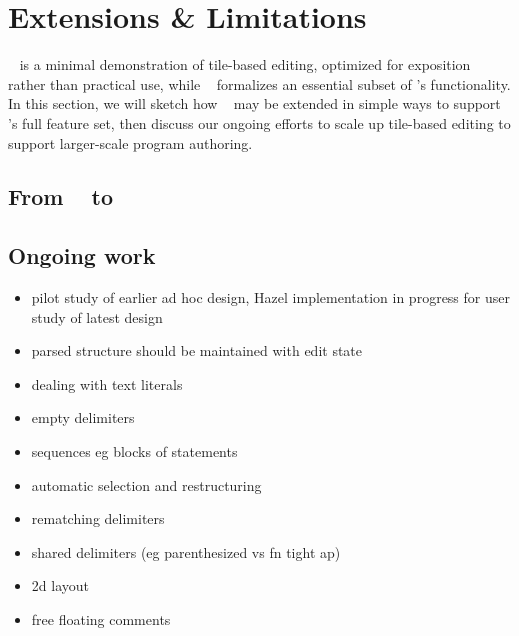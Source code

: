 \section{Extensions \& Limitations}

\tylr~ is a minimal demonstration of tile-based
editing, optimized for exposition rather than practical use,
while \ty~ formalizes an essential subset of \tylr's functionality.
In this section, we will sketch how \ty~ may be extended
in simple ways to support \tylr's full feature set,
then discuss our ongoing efforts to scale up tile-based
editing to support larger-scale program authoring.

\subsection{From \ty~ to \tylr}

\subsection{Ongoing work}


\begin{itemize}
\item pilot study of earlier ad hoc design, Hazel implementation in progress for user study of latest design
\item parsed structure should be maintained with edit state
\item dealing with text literals
\item empty delimiters
\item sequences eg blocks of statements
\item automatic selection and restructuring
\item rematching delimiters
\item shared delimiters (eg parenthesized vs fn tight ap)
\item 2d layout
\item free floating comments
\end{itemize}